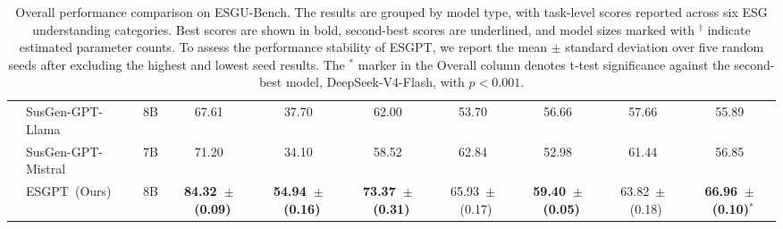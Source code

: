 \documentclass[11pt]{article}
\begin{document}
\begin{table}[t]
{\begin{tabular}{l|l|c|cccccc|c}
& SusGen-GPT-Llama & 8B & 67.61 & 37.70 & 62.00 & 53.70 & 56.66 & 57.66 & 55.89 \\
& SusGen-GPT-Mistral & 7B & 71.20 & 34.10 & 58.52 & 62.84 & 52.98 & 61.44 & 56.85 \\
& \textsf{ESGPT}~(Ours) & 8B & \textbf{84.32~$\pm$~(0.09)} & \textbf{54.94~$\pm$~(0.16)} & \textbf{73.37~$\pm$~(0.31)} & 65.93~$\pm$~(0.17) & \textbf{59.40~$\pm$~(0.05)} & 63.82~$\pm$~(0.18) & \textbf{66.96~$\pm$~(0.10)}$^{*}$ \\
\hline

\end{tabular}%
}
\caption{Overall performance comparison on \textsf{ESGU-Bench}. The results are grouped by model type, with task-level scores reported across six ESG understanding categories. Best scores are shown in bold, second-best scores are underlined, and model sizes marked with $^{\dagger}$ indicate estimated parameter counts. To assess the performance stability of \textsf{ESGPT}, we report the mean $\pm$ standard deviation over five random seeds after excluding the highest and lowest seed results. The $^{*}$ marker in the Overall column denotes t-test significance against the second-best model, DeepSeek-V4-Flash, with $p < 0.001$.}
\label{tab:overall_performance}
\end{table}
\end{document}
